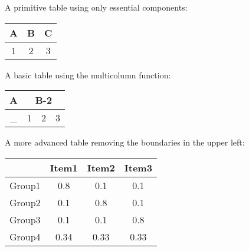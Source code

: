 \documentclass{article}
\begin{document}
A primitive table using only essential components:

\begin{tabular}{ccc}

  A  &  B  &  C \\

  \hline %

  1  &  2  &  3  \\ 

\end{tabular}

\bigskip




A basic table using the multicolumn function:

\begin{tabular}{|c|c|c|c|}

  \hline
    
  A   &  \multicolumn{3}{c|}{B-2}  \\
    
  \hline
    
  \_  &  1  &  2  &  3  \\ 
    
  \hline  
   
\end{tabular}

\bigskip


A more advanced table removing the boundaries in the upper left:

\begin{tabular}{|*{4}{c|}}  %

  \cline{2-4}
    
  \multicolumn{1}{c|}{} & Item1 & Item2 & Item3 \\ \hline
    
  Group1 & 0.8   & 0.1   & 0.1   \\ \hline
    
  Group2 & 0.1   & 0.8   & 0.1   \\ \hline
    
  Group3 & 0.1   & 0.1   & 0.8   \\ \hline
    
  Group4 & 0.34  & 0.33  & 0.33  \\ \hline
    
\end{tabular}
\end{document}
